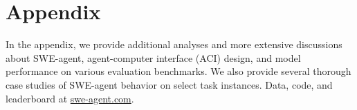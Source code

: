 \section*{Appendix}
In the appendix, we provide additional analyses and more extensive discussions about SWE-agent, agent-computer interface (ACI) design, and model performance on various evaluation benchmarks.
We also provide several thorough case studies of SWE-agent behavior on select task instances.
Data, code, and leaderboard at \href{https://swe-agent.com/}{swe-agent.com}.